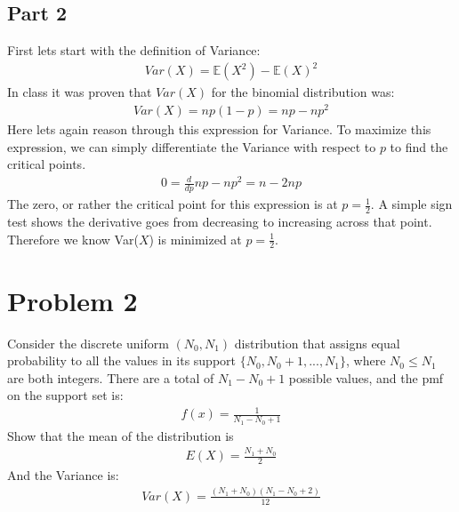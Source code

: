 \documentclass{article}
\begin{document}
\subsection*{Part 2}
First lets start with the definition of Variance:
\begin{align*}
Var(X)=\mathbb{E}(X^2)-\mathbb{E}(X)^2
\end{align*}
In class it was proven that $Var(X)$ for the binomial distribution was:
\begin{align*}
Var(X) = np(1-p) = np-np^2
\end{align*}
Here lets again reason through this expression for Variance. To maximize this expression, we can simply differentiate the Variance with respect to $p$ to find the critical points.
\begin{align*}
0 =\frac{d}{dp} np-np^2 = n - 2np
\end{align*}
The zero, or rather the critical point for this expression is at $p=\frac{1}{2}$. A simple sign test shows the derivative goes from decreasing to increasing across that point. Therefore we know Var($X$) is minimized at $p=\frac{1}{2}$.
\clearpage
\section*{Problem 2}
Consider the discrete uniform $(N_0,N_1)$ distribution that assigns equal probability to all the values in its support $\{N_0, N_0+1,...,N_1\}$, where $N_0\leq N_1$ are both integers. There are a total of $N_1-N_0+1$ possible values, and the pmf on the support set is:
\begin{align*}
f(x) = \frac{1}{N_1-N_0+1}
\end{align*}
Show that the mean of the distribution is 
\begin{align*}
E(X) = \frac{N_1+N_0}{2}
\end{align*}
And the Variance is:
\begin{align*}
Var(X) = \frac{(N_1+N_0)(N_1-N_0+2)}{12}
\end{align*}
\end{document}
